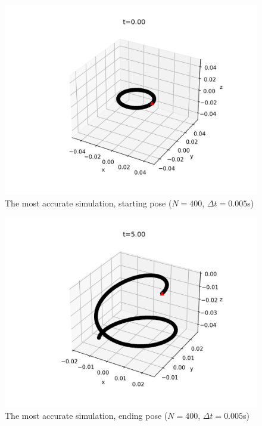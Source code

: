 \documentclass[letterpaper, 10 pt, conference]{ieeeconf}  %
\begin{document}
\begin{figure}[h!]
   \centering
   \includegraphics[width=0.8\linewidth]{../figures/n_400_dt_0-005_t=0s.png}
   \caption{The most accurate simulation, starting pose ($N=400$, $\Delta t = 0.005$s)}
   \label{fig:accurate_start}
\end{figure}

\begin{figure}[h!]
   \centering
   \includegraphics[width=0.8\linewidth]{../figures/n_400_dt_0-005_t=5s.png}
   \caption{The most accurate simulation, ending pose ($N=400$, $\Delta t = 0.005$s)}
   \label{fig:accurate_end}
\end{figure}
\end{document}
